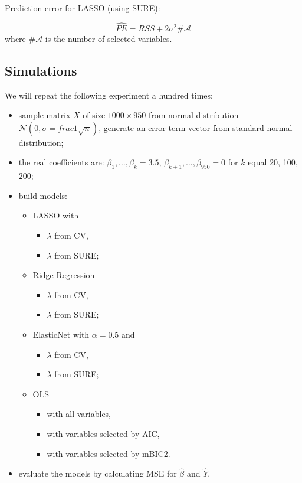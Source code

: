 \documentclass[
]{article}
\begin{document}
Prediction error for LASSO (using SURE):

\[\widehat{PE} = RSS + 2\sigma^2 \#\mathcal A\] where \(\#\mathcal A\)
is the number of selected variables.

\hypertarget{simulations-1}{%
\subsection{Simulations}\label{simulations-1}}

We will repeat the following experiment a hundred times:

\begin{itemize}
\item
  sample matrix \(X\) of size \(1000 \times 950\) from normal
  distribution \(\mathcal N (0, \sigma = frac 1 {\sqrt n})\), generate
  an error term vector from standard normal distribution;
\item
  the real coefficients are: \(\beta_1, \ldots, \beta_k = 3.5\),
  \(\beta_{k+1}, \ldots, \beta_{950} = 0\) for \(k\) equal 20, 100, 200;
\item
  build models:

  \begin{itemize}
  \item
    LASSO with

    \begin{itemize}
    \item
      \(\lambda\) from CV,
    \item
      \(\lambda\) from SURE;
    \end{itemize}
  \item
    Ridge Regression

    \begin{itemize}
    \item
      \(\lambda\) from CV,
    \item
      \(\lambda\) from SURE;
    \end{itemize}
  \item
    ElasticNet with \(\alpha=0.5\) and

    \begin{itemize}
    \item
      \(\lambda\) from CV,
    \item
      \(\lambda\) from SURE;
    \end{itemize}
  \item
    OLS

    \begin{itemize}
    \item
      with all variables,
    \item
      with variables selected by AIC,
    \item
      with variables selected by mBIC2.
    \end{itemize}
  \end{itemize}
\item
  evaluate the models by calculating MSE for \(\hat\beta\) and
  \(\hat Y\).
\end{itemize}
\end{document}
